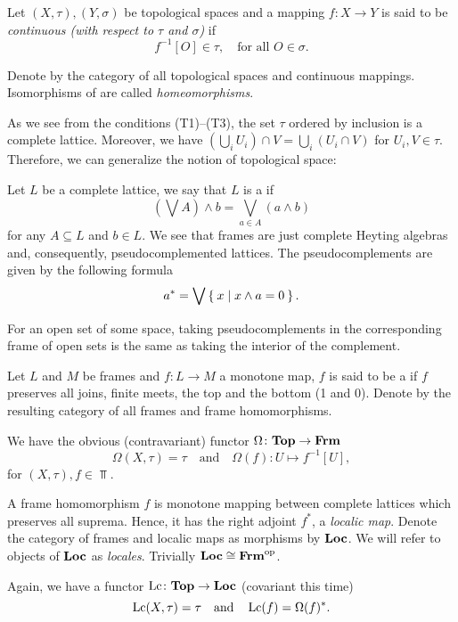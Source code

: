 Let $(X,\tau), (Y,\sigma)$ be topological spaces and a mapping $f\colon X\to Y$ is said to be \emph{continuous (with respect to $\tau$ and $\sigma$)} if
$$ f^{-1}[O] \in \tau,\quad\text{for all } O\in \sigma.$$

\noindent Denote by \Top{} the category of all topological spaces and continuous mappings. Isomorphisms of \Top{} are called \emph{homeomorphisms}.

As we see from the conditions (T1)--(T3), the set $\tau$ ordered by inclusion is a complete lattice. Moreover, we have $(\bigcup_i U_i)\cap V = \bigcup_i (U_i\cap V)$ for $U_i, V\in \tau$.
Therefore, we can generalize the notion of topological space:

Let $L$ be a complete lattice, we say that $L$ is a  if
$$ (\bigvee A)\wedge b = \bigvee_{a\in A} ( a\wedge b ) $$
for any $A\subseteq L$ and $b\in L$. We see that frames are just complete Heyting algebras and, consequently, pseudocomplemented lattices.
The pseudocomplements are given by the following formula
$$ a^* = \bigvee \Set{ x | x\wedge a = 0}. $$

\noindent For an open set of some space, taking pseudocomplements in the corresponding frame of open sets is the same as taking the interior of the complement.

Let $L$ and $M$ be frames and $f\colon L\to M$ a monotone map, $f$ is said to be a  if $f$ preserves all joins, finite meets, the top and the bottom (1 and 0).
Denote by \Frm{} the resulting category of all frames and frame homomorphisms.

We have the obvious (contravariant) functor $\Omega\colon \mathbf{Top}\to \mathbf{Frm}$
$$ \Omega(X,\tau) = \tau\quad\text{and}\quad \Omega(f)\colon U\mapsto f^{-1}[U],$$
for $(X,\tau), f \in \Top$.

A frame homomorphism $f$ is monotone mapping between complete lattices which preserves all suprema. Hence, it has the right adjoint $f^*$, a \emph{localic map}.
Denote the category of frames and localic maps as morphisms by $\mathbf{Loc}$. We will refer to objects of $\mathbf{Loc}$ as \emph{locales}. Trivially $\mathbf{Loc}\cong\mathbf{Frm}^{\text{op}}$.

Again, we have a functor $\operatorname{Lc}\colon \mathbf{Top}\to \mathbf{Loc}$ (covariant this time)
$$ \operatorname{Lc}(X,\tau) = \tau\quad\text{and}\quad \operatorname{Lc}(f) = \Omega(f)^*.$$

